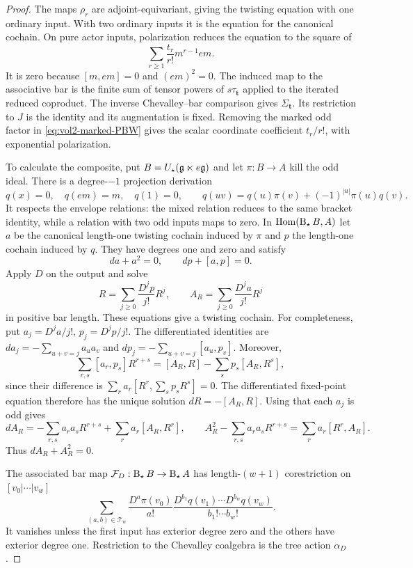 \begin{proof}
The maps $\rho_r$ are adjoint-equivariant, giving the twisting
equation with one ordinary input. With two ordinary inputs it is
the equation for the canonical cochain. On pure actor inputs,
polarization reduces the equation to the square of
\[
 \sum_{r\geq1}\frac{t_r}{r!}m^{r-1}em.
\]
It is zero because $[m,em]=0$ and $(em)^2=0$. The induced map
to the associative bar is the finite sum of tensor powers of
$s\tau_{\mathbf t}$ applied to the iterated reduced coproduct.
The inverse Chevalley--bar comparison gives $\Sigma_{\mathbf t}$.
Its restriction to $J$ is the identity and its augmentation is
fixed. Removing the marked odd factor in
\eqref{eq:vol2-marked-PBW} gives the scalar coordinate coefficient
$t_r/r!$, with exponential polarization.

To calculate the composite, put
$B=U_{\star}(\mathfrak g\ltimes e\mathfrak g)$ and let $\pi:B\to A$
kill the odd ideal. There is a degree-$-1$ projection derivation
\begin{equation}\label{eq:vol2-actor-contraction}
 q(x)=0,\quad q(em)=m,\quad q(1)=0,\qquad
 q(uv)=q(u)\pi(v)+(-1)^{|u|}\pi(u)q(v).
\end{equation}
It respects the envelope relations: the mixed relation reduces to
the same bracket identity, while a relation with two odd inputs
maps to zero. In $\operatorname{Hom}(\operatorname{B}_{\star} B,A)$ let $a$ be the
canonical length-one twisting cochain induced by $\pi$ and $p$
the length-one cochain induced by $q$. They have degrees one and
zero and satisfy
\[
 da+a^2=0,\qquad dp+[a,p]=0.
\]
Apply $D$ on the output and solve
\[
 R=\sum_{j\geq0}\frac{D^jp}{j!}R^j,
 \qquad A_R=\sum_{j\geq0}\frac{D^ja}{j!}R^j
\]
in positive bar length. These equations give a twisting cochain.
For completeness, put $a_j=D^ja/j!$, $p_j=D^jp/j!$.
The differentiated identities are
$da_j=-\sum_{u+v=j}a_ua_v$ and
$dp_j=-\sum_{u+v=j}[a_u,p_v]$. Moreover,
\[
 \sum_{r,s}[a_r,p_s]R^{r+s}
 =[A_R,R]-\sum_s p_s[A_R,R^s],
\]
since their difference is
$\sum_r a_r[R^r,\sum_s p_sR^s]=0$.
The differentiated fixed-point equation therefore has the unique
solution $dR=-[A_R,R]$. Using that each $a_j$ is odd gives
\[
 dA_R=-\sum_{r,s}a_ra_sR^{r+s}
                   +\sum_r a_r[A_R,R^r],\qquad
 A_R^2-\sum_{r,s}a_ra_sR^{r+s}
                   =\sum_r a_r[R^r,A_R].
\]
Thus $dA_R+A_R^2=0$.

The associated bar map $\mathcal F_D:\operatorname{B}_{\star} B\to\operatorname{B}_{\star} A$ has
length-$(w+1)$ corestriction on $[v_0|\cdots|v_w]$
\begin{equation}\label{eq:vol2-profile-bar-tree}
 \sum_{(a,b)\in\mathcal T_w}
 \frac{D^a\pi(v_0)}{a!}
 \frac{D^{b_1}q(v_1)\cdots D^{b_w}q(v_w)}{b_1!\cdots b_w!}.
\end{equation}
It vanishes unless the first input has exterior degree zero and the
others have exterior degree one. Restriction to the Chevalley coalgebra
is the tree action $\alpha_D$.


\end{proof}
